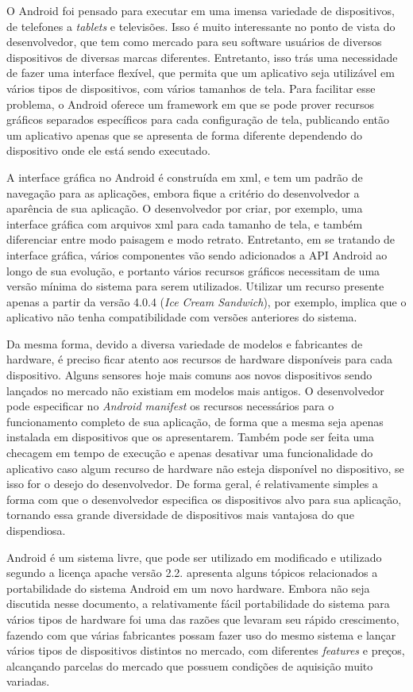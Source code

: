 O Android foi pensado para executar em uma imensa variedade de dispositivos, de telefones a \textit{tablets} e televisões. Isso é muito interessante no ponto de vista do desenvolvedor, que tem como mercado para seu software usuários de diversos dispositivos de diversas marcas diferentes. Entretanto, isso trás uma necessidade de fazer uma interface flexível, que permita que um aplicativo seja utilizável em vários tipos de dispositivos, com vários tamanhos de tela. Para facilitar esse problema, o Android oferece um framework em que se pode prover recursos gráficos separados específicos para cada configuração de tela, publicando então um aplicativo apenas que se apresenta de forma diferente dependendo do dispositivo onde ele está sendo executado.  

A interface gráfica no Android é construída em xml, e tem um padrão de navegação para as aplicações, embora fique a critério do desenvolvedor a aparência de sua aplicação. O desenvolvedor por criar, por exemplo, uma interface gráfica com arquivos xml para cada tamanho de tela, e também diferenciar entre modo paisagem e modo retrato. Entretanto, em se tratando de interface gráfica, vários componentes vão sendo adicionados a API Android ao longo de sua evolução, e portanto vários recursos gráficos necessitam de uma versão mínima do sistema para serem utilizados. Utilizar um recurso presente apenas a partir da versão 4.0.4 (\textit{Ice Cream Sandwich}), por exemplo, implica que o aplicativo não tenha compatibilidade com versões anteriores do sistema.  

Da mesma forma, devido a diversa variedade de modelos e fabricantes de hardware, é preciso ficar atento aos recursos de hardware disponíveis para cada dispositivo. Alguns sensores hoje mais comuns aos novos dispositivos sendo lançados no mercado não existiam em modelos mais antigos. O desenvolvedor pode especificar no \textit{Android manifest} os recursos necessários para o funcionamento completo de sua aplicação, de forma que a mesma seja apenas instalada em dispositivos que os apresentarem. Também pode ser feita uma checagem em tempo de execução e apenas desativar uma funcionalidade do aplicativo caso algum recurso de hardware não esteja disponível no dispositivo, se isso for o desejo do desenvolvedor. De forma geral, é relativamente simples a forma com que o desenvolvedor especifica os dispositivos alvo para sua aplicação, tornando essa grande diversidade de dispositivos mais vantajosa do que dispendiosa. 

Android é um sistema livre, que pode ser utilizado em modificado e utilizado segundo a licença apache versão 2.2.  apresenta alguns tópicos relacionados a portabilidade do sistema Android em um novo hardware. Embora não seja discutida nesse documento, a relativamente fácil portabilidade do sistema para vários tipos de hardware foi uma das razões que levaram seu rápido crescimento, fazendo com que várias fabricantes possam fazer uso do mesmo sistema e lançar vários tipos de dispositivos distintos no mercado, com diferentes \textit{features} e preços, alcançando parcelas do mercado que possuem condições de aquisição muito variadas.
